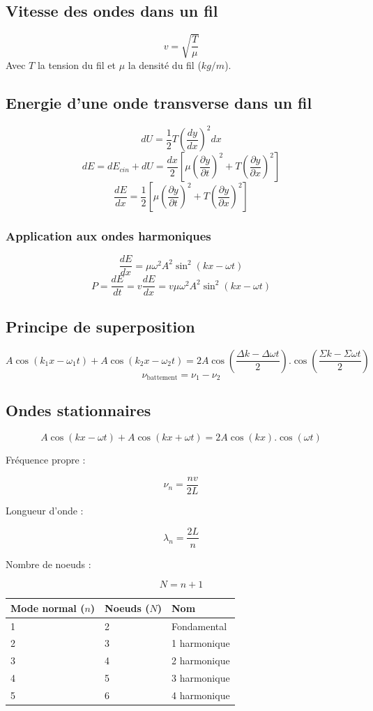 \documentclass[a4paper,10pt,openright,titlepage]{report}
\begin{document}
\subsection{Vitesse des ondes dans un fil}
$$v = \sqrt{\frac{T}{\mu}}$$
Avec $T$ la tension du fil et $\mu$ la densité du fil ($kg/m$).

\subsection{Energie d'une onde transverse dans un fil}
$$dU = \frac{1}{2} T \left(\frac{dy}{dx} \right)^2 dx$$
$$dE = dE_{cin}+dU = \frac{dx}{2} \left[\mu \left( \frac{\partial y}{\partial t}\right)^2 + T \left( \frac{\partial y}{\partial x}\right)^2 \right]$$
$$\frac{dE}{dx} = \frac{1}{2} \left[ \mu \left( \frac{\partial y}{\partial t}\right)^2 + T \left( \frac{\partial y}{\partial x}\right)^2 \right]$$
\subsubsection{Application aux ondes harmoniques}
$$\frac{dE}{dx} = \mu \omega^2 A^2 \sin^2 (kx - \omega t)$$
$$P = \frac{dE}{dt} = v\frac{dE}{dx} = v\mu \omega^2 A^2 \sin^2(kx-\omega t)$$
\subsection{Principe de superposition}
$$A \cos(k_1 x - \omega_1 t) + A \cos(k_2 x - \omega_2 t) = 2A \cos \left( \frac{\Delta k - \Delta \omega t}{2} \right).\cos \left( \frac{\Sigma k - \Sigma \omega t}{2} \right)$$
$$\nu_{\mbox{battement}} = \nu_1 - \nu_2$$
\subsection{Ondes stationnaires}
$$A \cos (kx - \omega t) + A \cos(kx + \omega t) = 2A \cos (kx) . \cos (\omega t)$$

Fréquence propre :

$$\nu_n = \frac{n v}{2L}$$

Longueur d'onde :

$$\lambda_n = \frac{2 L}{n}$$

Nombre de noeuds :

$$N = n + 1$$

\begin{center}
\begin{tabular}{|l|l|l|}\hline
\bfseries Mode normal ($n$) & \bfseries Noeuds ($N$) & \bfseries Nom \\ \hline
1 & 2 & Fondamental \\ \hline
2 & 3 & 1 harmonique \\ \hline
3 & 4 & 2 harmonique \\ \hline
4 & 5 & 3 harmonique \\ \hline
5 & 6 & 4 harmonique \\ \hline
\end{tabular}
\end{center}
\end{document}
